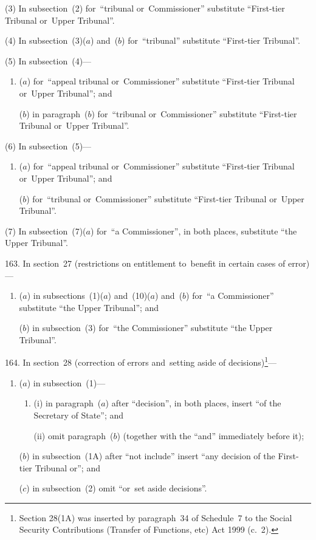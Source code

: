 \documentclass[12pt,a4paper]{article}
\begin{document}
(3) In subsection~(2) for~“tribunal or~Commissioner” substitute “First-tier Tribunal or~Upper Tribunal”.

(4) In subsection~(3)($a$)  and~($b$)  for~“tribunal” substitute “First-tier Tribunal”.

(5) In subsection~(4)—
\begin{enumerate}\item[]
($a$) for~“appeal tribunal or~Commissioner” substitute “First-tier Tribunal or~Upper Tribunal”; and

($b$) in paragraph~($b$)  for~“tribunal or~Commissioner” substitute “First-tier Tribunal or~Upper Tribunal”.
\end{enumerate}

(6) In subsection~(5)—
\begin{enumerate}\item[]
($a$) for~“appeal tribunal or~Commissioner” substitute “First-tier Tribunal or~Upper Tribunal”; and

($b$) for~“tribunal or~Commissioner” substitute “First-tier Tribunal or~Upper Tribunal”.
\end{enumerate}

(7) In subsection~(7)($a$)  for~“a Commissioner”, in both places, substitute “the Upper Tribunal”.

\medskip

163.  In section~27 (restrictions on entitlement to~benefit in certain cases of error)—
\begin{enumerate}\item[]
($a$) in subsections~(1)($a$)  and~(10)($a$)  and~($b$)  for~“a Commissioner” substitute “the Upper Tribunal”; and

($b$) in subsection~(3) for~“the Commissioner” substitute “the Upper Tribunal”.
\end{enumerate}

\medskip

164.  In section~28 (correction of errors and~setting aside of decisions)\footnote{Section 28(1A) was inserted by paragraph~34 of Schedule~7 to the Social Security Contributions (Transfer of Functions, etc) Act 1999 (c.~2).}—
\begin{enumerate}\item[]
($a$) in subsection~(1)—
\begin{enumerate}\item[]
(i) in paragraph~($a$)  after “decision”, in both places, insert “of the Secretary of State”; and

(ii) omit paragraph~($b$)  (together with the “and” immediately before it);
\end{enumerate}

($b$) in subsection~(1A) after “not include” insert “any decision of the First-tier Tribunal or”; and

($c$) in subsection~(2) omit “or~set aside decisions”.
\end{enumerate}
\end{document}
